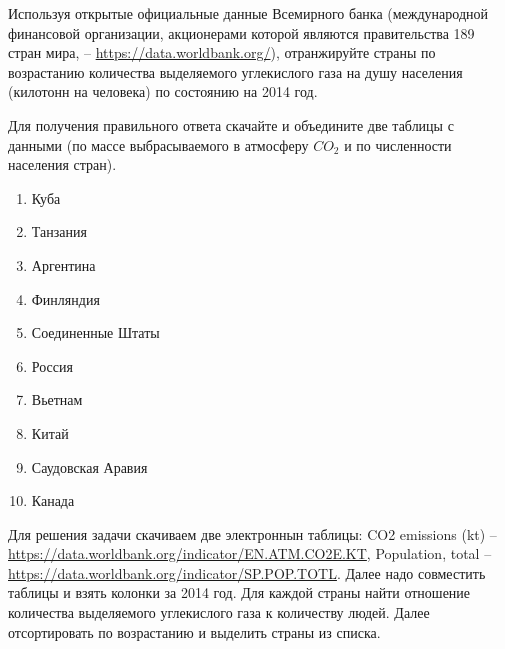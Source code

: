 
Используя открытые официальные данные Всемирного банка (международной финансовой организации, акционерами которой являются правительства 189 стран мира, – \url{https://data.worldbank.org/}),  отранжируйте страны по возрастанию количества выделяемого углекислого газа на душу 
населения (килотонн на человека) по состоянию на 2014 год.

Для получения правильного ответа скачайте и объедините две таблицы с данными (по массе выбрасываемого в атмосферу $CO_2$ и по численности населения стран).

\begin{enumerate}
    \item Куба
    \item Танзания
    \item Аргентина
    \item Финляндия
    \item Соединенные Штаты
    \item Россия
    \item Вьетнам
    \item Китай
    \item Саудовская Аравия
    \item Канада
\end{enumerate}

\solutionSection

Для решения задачи скачиваем две электроннын таблицы: CO2 emissions (kt) -- \url{https://data.worldbank.org/indicator/EN.ATM.CO2E.KT}, Population, total -- \url{https://data.worldbank.org/indicator/SP.POP.TOTL}. Далее надо совместить таблицы и взять колонки за 2014 год. Для каждой страны найти отношение количества выделяемого углекислого газа к количеству людей. Далее отсортировать по возрастанию и выделить страны из списка. 


